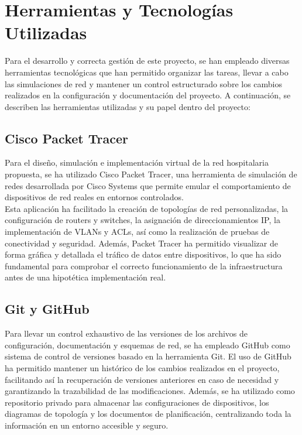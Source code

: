 \section{Herramientas y Tecnologías Utilizadas}
Para el desarrollo y correcta gestión de este proyecto, se han empleado diversas herramientas tecnológicas que han permitido organizar las tareas, llevar a cabo las 
simulaciones de red y mantener un control estructurado sobre los cambios realizados en la configuración y documentación del proyecto. A continuación, se describen 
las herramientas utilizadas y su papel dentro del proyecto:

\subsection{Cisco Packet Tracer}
Para el diseño, simulación e implementación virtual de la red hospitalaria propuesta, se ha utilizado Cisco Packet Tracer, una herramienta de simulación de redes 
desarrollada por Cisco Systems que permite emular el comportamiento de dispositivos de red reales en entornos controlados.\\
Esta aplicación ha facilitado la creación de topologías de red personalizadas, la configuración de routers y switches, la asignación de direccionamientos IP, la 
implementación de VLANs y ACLs, así como la realización de pruebas de conectividad y seguridad. Además, Packet Tracer ha permitido visualizar de forma gráfica y 
detallada el tráfico de datos entre dispositivos, lo que ha sido fundamental para comprobar el correcto funcionamiento de la infraestructura antes de una hipotética 
implementación real.

\subsection{Git y GitHub}
Para llevar un control exhaustivo de las versiones de los archivos de configuración, documentación y esquemas de red, se ha empleado GitHub como sistema de control de 
versiones basado en la herramienta Git.
El uso de GitHub ha permitido mantener un histórico de los cambios realizados en el proyecto, facilitando así la recuperación de versiones anteriores en caso de necesidad 
y garantizando la trazabilidad de las modificaciones. Además, se ha utilizado como repositorio privado para almacenar las configuraciones de dispositivos, los diagramas de 
topología y los documentos de planificación, centralizando toda la información en un entorno accesible y seguro.

